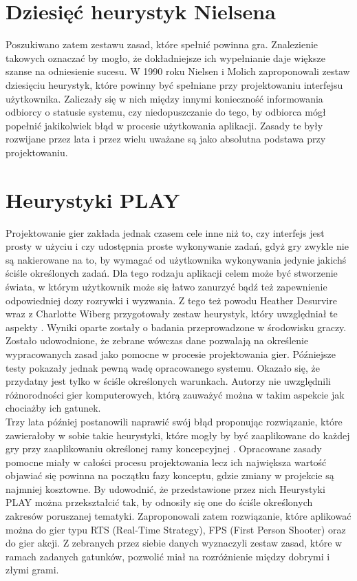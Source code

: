 \documentclass[a4paper,12pt,numbers=noenddot]{report}
\begin{document}
\section{Dziesięć heurystyk Nielsena}
Poszukiwano zatem zestawu zasad, które spełnić powinna gra. Znalezienie takowych oznaczać by mogło, że dokładniejsze ich wypełnianie daje większe szanse na odniesienie sucesu. W 1990 roku Nielsen i Molich \cite{art_Nielsen} zaproponowali zestaw dziesięciu heurystyk, które powinny być spełniane przy projektowaniu interfejsu użytkownika. Zaliczały się w nich między innymi konieczność informowania odbiorcy o statusie systemu, czy niedopuszczanie do tego, by odbiorca mógł popełnić jakikolwiek błąd w procesie użytkowania aplikacji. Zasady te były rozwijane przez lata i przez wielu uważane są jako absolutna podstawa przy projektowaniu. 

\section{Heurystyki PLAY}
Projektowanie gier zakłada jednak czasem cele inne niż to, czy interfejs jest prosty w użyciu i czy udostępnia proste wykonywanie zadań, gdyż gry zwykle nie są nakierowane na to, by wymagać od użytkownika wykonywania jedynie jakichś ściśle określonych zadań. Dla tego rodzaju aplikacji celem może być stworzenie świata, w którym użytkownik może się łatwo zanurzyć bądź też zapewnienie odpowiedniej dozy rozrywki i wyzwania. Z tego też powodu Heather Desurvire wraz z Charlotte Wiberg przygotowały zestaw heurystyk, który uwzględniał te aspekty \cite{art_PLAY1}. Wyniki oparte zostały o badania przeprowadzone w środowisku graczy. Zostało udowodnione, że zebrane wówczas dane pozwalają na określenie wypracowanych zasad jako pomocne w procesie projektowania gier. Późniejsze testy pokazały jednak pewną wadę opracowanego systemu. Okazało się, że przydatny jest tylko w ściśle określonych warunkach. Autorzy nie uwzględnili różnorodności gier komputerowych, którą zauważyć można w takim aspekcie jak chociażby ich gatunek. \\
Trzy lata później postanowili naprawić swój błąd proponując rozwiązanie, które zawierałoby w sobie takie heurystyki, które mogły by być zaaplikowane do każdej gry przy zaaplikowaniu określonej ramy koncepcyjnej \cite{art_PLAY2}. Opracowane zasady pomocne miały w całości procesu projektowania lecz ich największa wartość objawiać się powinna na początku fazy konceptu, gdzie zmiany w projekcie są najmniej kosztowne. By udowodnić, że przedstawione przez nich Heurystyki PLAY można przekształcić tak, by odnosiły się one do ściśle określonych zakresów poruszanej tematyki. Zaproponowali zatem rozwiązanie, które aplikować można do gier typu RTS (Real-Time Strategy), FPS (First Person Shooter) oraz do gier akcji. Z zebranych przez siebie danych wyznaczyli zestaw zasad, które w ramach zadanych gatunków, pozwolić miał na rozróżnienie między dobrymi i złymi grami. 
\end{document}
